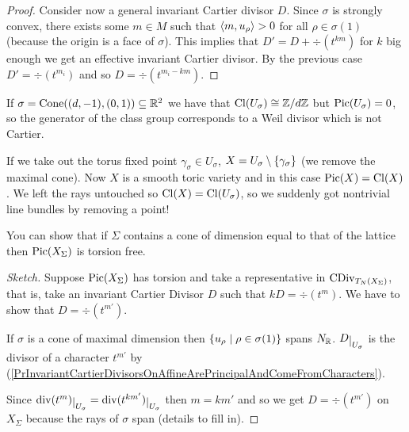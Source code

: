 \begin{proof}
\bigskip

Consider now a general invariant Cartier divisor $D$. Since $\sigma$ is strongly convex, there exists some $m\in M$ such that $\left\langle {m,u_\rho}\right\rangle>0$ for all $\rho\in \sigma(1)$ (because the origin is a face of $\sigma$). This implies that $D'=D+\div(t^{km})$ for $k$ big enough we get an effective invariant Cartier divisor. By the previous case $D'=\div(t^{m_i})$ and so $D=\div(t^{m_i-km})$.
\end{proof}



\begin{example}
If $\sigma=\operatorname{Cone}((d,-1),(0,1))\subseteq \mathbb{R}^2$ we have that $\operatorname{Cl}(U_\sigma)\cong {\mathbb{Z}/{d}\mathbb{Z}}$ but $\operatorname{Pic}(U_\sigma)=0$, so the generator of the class group corresponds to a Weil divisor which is not Cartier.

If we take out the torus fixed point $\gamma_\sigma\in U_\sigma$, $X=U_\sigma\setminus\left\{{\gamma_\sigma}\right\}$ (we remove the maximal cone). Now $X$ is a smooth toric variety and in this case $\operatorname{Pic}(X)=\operatorname{Cl}(X)$. We left the rays untouched so $\operatorname{Cl}(X)=\operatorname{Cl}(U_\sigma)$, so we suddenly got nontrivial line bundles by removing a point!
\end{example}

\begin{remark}
You can show that if $\Sigma$ contains a cone of dimension equal to that of the lattice then $\operatorname{Pic}(X_\Sigma)$ is torsion free.
\end{remark}
\begin{proof}[Sketch]
Suppose $\operatorname{Pic}(X_\Sigma)$ has torsion and take a representative in $\operatorname{CDiv}_{T_N(X_\Sigma)}$, that is, take an invariant Cartier Divisor $D$ such that $kD=\div(t^m)$. We have to show that $D=\div(t^{m'})$.

If $\sigma$ is a cone of maximal dimension then $\left\{{u_\rho\mid \rho\in \sigma(1)}\right\}$ spans $N_{\mathbb{R}}$. $D\res{U_\sigma}$ is the divisor of a character $t^{m'}$ by (\ref{PrInvariantCartierDivisorsOnAffineArePrincipalAndComeFromCharacters}).

Since $\div(t^m)\res{U_\sigma}=\div(t^{km'})\res{U_\sigma}$ then $m=km'$ and so we get $D=\div(t^{m'})$ on $X_\Sigma$ because the rays of $\sigma$ span (details to fill in).
\end{proof}



